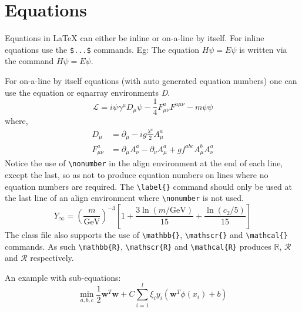 \documentclass[Theme1]{{template_material/eurostat}}
\begin{document}
\newpage %

\section{Equations}

Equations in \LaTeX{} can either be inline or on-a-line by itself. For
inline equations use the \verb+$...$+ commands. Eg: The equation
$H\psi = E \psi$ is written via the command $H \psi = E \psi$.

For on-a-line by itself equations (with auto generated equation numbers)
one can use the equation or eqnarray environments \textit{D}.
\begin{equation}
\mathcal{L} = i {\psi} \gamma^\mu D_\mu \psi
    - \frac{1}{4} F_{\mu\nu}^a F^{a\mu\nu} - m {\psi} \psi
\label{eq1}
\end{equation}
where,
\begin{align}
D_\mu &=  \partial_\mu - ig \frac{\lambda^a}{2} A^a_\mu
\nonumber \\
F^a_{\mu\nu} &= \partial_\mu A^a_\nu - \partial_\nu A^a_\mu
    + g f^{abc} A^b_\mu A^a_\nu
\label{eq2}
\end{align}
Notice the use of \verb+\nonumber+ in the align environment at the end
of each line, except the last, so as not to produce equation numbers on
lines where no equation numbers are required. The \verb+\label{}+ command
should only be used at the last line of an align environment where
\verb+\nonumber+ is not used.
\begin{equation}
Y_\infty = \left( \frac{m}{\textrm{GeV}} \right)^{-3}
    \left[ 1 + \frac{3 \ln(m/\textrm{GeV})}{15}
    + \frac{\ln(c_2/5)}{15} \right]
\end{equation}
The class file also supports the use of \verb+\mathbb{}+, \verb+\mathscr{}+ and
\verb+\mathcal{}+ commands. As such \verb+\mathbb{R}+, \verb+\mathscr{R}+
and \verb+\mathcal{R}+ produces $\mathbb{R}$, $\mathscr{R}$ and $\mathcal{R}$
respectively.

An example with sub-equations:
\begin{subequations}
\begin{equation}
  \operatorname{min}_{a,b,c} 
  \frac{1}{2}\mathbf{w}^{T}\mathbf{w} + C \sum_{i=1}^{l}\xi_{i} 
\end{equation}    
\begin{equation}
  y_{i}\left(\mathbf{w}^{T}\phi(x_{i})+b\right)
\end{equation}
\end{subequations}
\end{document}
